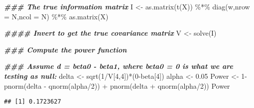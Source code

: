\documentclass[
]{article}
\newenvironment{Shaded}{\begin{snugshade}}{\end{snugshade}}
\newcommand{\AttributeTok}[1]{\textcolor[rgb]{0.77,0.63,0.00}{#1}}
\newcommand{\DecValTok}[1]{\textcolor[rgb]{0.00,0.00,0.81}{#1}}
\newcommand{\DocumentationTok}[1]{\textcolor[rgb]{0.56,0.35,0.01}{\textbf{\textit{#1}}}}
\newcommand{\FloatTok}[1]{\textcolor[rgb]{0.00,0.00,0.81}{#1}}
\newcommand{\FunctionTok}[1]{\textcolor[rgb]{0.00,0.00,0.00}{#1}}
\newcommand{\NormalTok}[1]{#1}
\newcommand{\OtherTok}[1]{\textcolor[rgb]{0.56,0.35,0.01}{#1}}
\newcommand{\SpecialCharTok}[1]{\textcolor[rgb]{0.00,0.00,0.00}{#1}}
\begin{document}
\begin{Shaded}
\begin{Highlighting}[]
\DocumentationTok{\#\#\# The true information matrix}
\NormalTok{I }\OtherTok{\textless{}{-}} \FunctionTok{as.matrix}\NormalTok{(}\FunctionTok{t}\NormalTok{(X)) }\SpecialCharTok{\%*\%} \FunctionTok{diag}\NormalTok{(w,}\AttributeTok{nrow =}\NormalTok{ N,}\AttributeTok{ncol =}\NormalTok{ N) }\SpecialCharTok{\%*\%} \FunctionTok{as.matrix}\NormalTok{(X)}



\DocumentationTok{\#\#\#\# Invert to get the true covariance matrix }
\NormalTok{V }\OtherTok{\textless{}{-}} \FunctionTok{solve}\NormalTok{(I)}



\DocumentationTok{\#\#\# Compute the power function }

\DocumentationTok{\#\#\# Assume d = beta0 {-} beta1, where beta0 = 0 is what we are testing as null:}
\NormalTok{delta }\OtherTok{\textless{}{-}} \FunctionTok{sqrt}\NormalTok{(}\DecValTok{1}\SpecialCharTok{/}\NormalTok{V[}\DecValTok{4}\NormalTok{,}\DecValTok{4}\NormalTok{])}\SpecialCharTok{*}\NormalTok{(}\DecValTok{0}\SpecialCharTok{{-}}\NormalTok{beta[}\DecValTok{4}\NormalTok{])}
\NormalTok{alpha }\OtherTok{\textless{}{-}} \FloatTok{0.05}
\NormalTok{Power }\OtherTok{\textless{}{-}} \DecValTok{1}\SpecialCharTok{{-}} \FunctionTok{pnorm}\NormalTok{(delta }\SpecialCharTok{{-}} \FunctionTok{qnorm}\NormalTok{(alpha}\SpecialCharTok{/}\DecValTok{2}\NormalTok{)) }\SpecialCharTok{+} \FunctionTok{pnorm}\NormalTok{(delta }\SpecialCharTok{+} \FunctionTok{qnorm}\NormalTok{(alpha}\SpecialCharTok{/}\DecValTok{2}\NormalTok{))}
\NormalTok{Power}
\end{Highlighting}
\end{Shaded}

\begin{verbatim}
## [1] 0.1723627
\end{verbatim}
\end{document}
